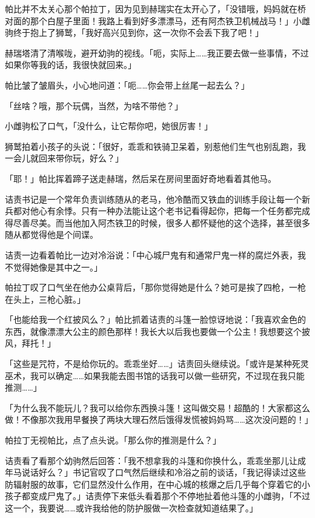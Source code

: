 帕比并不太关心那个帕拉丁，因为见到赫瑞实在太开心了，「没错哦，妈妈就在桥对面的那个白屋子里面！我路上看到好多漂漂马，还有阿杰铁卫机械战马！」小雌驹终于抱上了狮鹫，「我好高兴见到你，这一次你不会丢下我了吧！」

赫瑞塔清了清喉咙，避开幼驹的视线。「呃，实际上……我正要去做一些事情，不过如果你等我的话，我很快就回来。」

帕比皱了皱眉头，小心地问道：「呃……你会带上丝尾一起去么？」

「丝啥？哦，那个玩偶，当然，为啥不带他？」

小雌驹松了口气，「没什么，让它帮你吧，她很厉害！」

狮鹫拍着小孩子的头说：「很好，乖乖和铁骑卫呆着，别惹他们生气也别乱跑，我一会儿就回来带你玩，好么？」

「耶！」帕比挥着蹄子送走赫瑞，然后呆在房间里面好奇地看着其他马。

\horizonline


诘责书记是一个常年负责训练随从的老马，他冷酷而又铁血的训练手段让每一个新兵都对他心有余悸。只有一种办法能让这个老书记看得起你，把每一个任务都完成得尽善尽美。而当他加入阿杰铁卫的时候，很多人都怀疑他的这个选择，甚至很多随从都觉得他是个间谍。

诘责一边看着帕比一边对冷浴说：「中心城尸鬼有和通常尸鬼一样的腐烂外表，我不觉得她像是其中之一。」

帕拉丁叹了口气坐在他办公桌背后，「那你觉得她是什么？她可是挨了四枪，一枪在头上，三枪心脏。」

「也能给我一个红披风么？」帕比抓着诘责的斗篷一脸惊讶地说：「我喜欢金色的东西，就像漂漂大公主的颜色那样！我长大以后我也要做一个公主！我想要这个披风，拜托！」

「这些是咒符，不是给你玩的。乖乖坐好……」诘责回头继续说。「或许是某种死灵巫术，我可以确定……如果我能去图书馆的话我可以做一些研究，不过现在我只能推测……」

「为什么我不能玩儿？我可以给你东西换斗篷！这叫做交易！超酷的！大家都这么做！不像那次我用早餐换了两块大理石然后饿得发慌被妈妈骂……这次没问题的！」

帕拉丁无视帕比，点了点头说。「那么你的推测是什么？」

诘责看了看那个幼驹然后回答：「我不想拿我的斗篷和你换什么，乖乖坐那儿让成年马说话好么？」书记官叹了口气然后继续和冷浴之前的谈话，「我记得读过这些防辐射服的故事，它们显然没什么作用，在中心城的核爆之后几乎每个穿着它的小孩子都变成尸鬼了。」诘责停下来低头看着那个不停地扯着他斗篷的小雌驹，「不过这一个，我要说……或许我给他的防护服做一次检查就知道结果了。」

